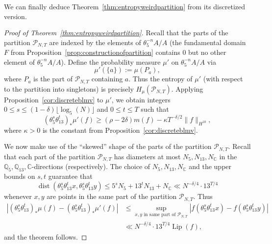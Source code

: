 \documentclass[11pt]{amsart}
\theoremstyle{definition}
\newcommand{\C}{{\mathbb C}}
\newcommand{\Q}{{\mathbb Q}}
\DeclareMathOperator{\dist}{dist}
\DeclareMathOperator{\Lip}{Lip}
\begin{document}
We can finally deduce Theorem~\ref{thm:entropyweirdpartition} from its discretized version.

\begin{proof}[Proof of Theorem~\ref{thm:entropyweirdpartition}]
Recall that the parts of the partition $\mathcal{P}_{N,T}$ are indexed by the elements of $\theta_5^{-n}A/A$ (the fundamental domain $F$ from Proposition~\ref{prop:constructionofpartition} contains $0$ but no other element of $\theta_5^{-n}A/A$).  Define the probability measure $\mu'$ on $\theta_5^{-n}A/A$ via $$\mu'(\{a\}):= \mu(P_a),$$ where $P_a$ is the part of $\mathcal{P}_{N,T}$ containing $a$.  Thus the entropy of $\mu'$ (with respect to the partition into singletons) is precisely $H_\mu(\mathcal{P}_{N,T})$.  Applying Proposition~\ref{cor:discreteblmv} to $\mu'$, we obtain integers $0 \le s \le (1 - \delta)\lfloor \log_5(N) \rfloor$ and $0 \le t \le T$ such that
$$(\theta_5^s\theta_{13}^t)_*\mu'(f) \ge (\rho - 2\delta)m(f) - \kappa T^{-\delta/2}\|f\|_{H^{10}},$$
where $\kappa>0$ is the constant from Proposition~\ref{cor:discreteblmv}.

We now make use of the ``skewed'' shape of the parts of the partition $\mathcal{P}_{N,T}$.  Recall that each part of the partition $\mathcal{P}_{N,T}$ has diameters at most $N_5, N_{13}, N_{\C}$ in the $\Q_5,\Q_{13},\C$-directions (respectively).
The choice of $N_5, N_{13}, N_{\C}$ and the upper bounds on $s, t$ guarantee that
$$\dist(\theta_5^s\theta_{13}^tx, \theta_5^s\theta_{13}^t y) \leq 5^s N_5+13^t N_{13}+N_{\C} \ll N^{-\delta/4} \cdot 13^{T/4}$$
whenever $x,y$ are points in the same part of the partition $\mathcal{P}_{N,T}$.
Thus
\begin{align*}
|(\theta_5^s\theta_{13}^t)_*\mu(f) - (\theta_5^s\theta_{13}^t)_*\mu'(f)| &\le \sup_{\text{$x,y$ in same part of $\mathcal{P}_{N,T}$}} |f(\theta_5^s\theta_{13}^t x) - f(\theta_5^s\theta_{13}^t y)|\\
 &\ll N^{-\delta/4} \cdot 13^{T/4} \Lip(f),
\end{align*}
and the theorem follows.
%
\end{proof}
\end{document}
